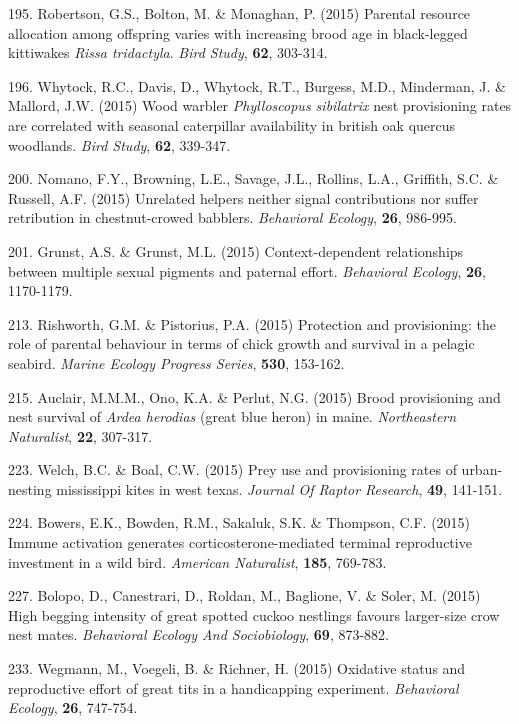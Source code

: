 195. Robertson, G.S., Bolton, M. \&  Monaghan, P. (2015) Parental resource allocation among offspring varies with increasing brood age in black-legged kittiwakes \textit{Rissa tridactyla}. \textit{Bird Study},  \textbf{62}, 303-314.

196. Whytock, R.C., Davis, D., Whytock, R.T., Burgess, M.D., Minderman, J. \&  Mallord, J.W. (2015) Wood warbler \textit{Phylloscopus sibilatrix} nest provisioning rates are correlated with seasonal caterpillar availability in british oak quercus woodlands. \textit{Bird Study},  \textbf{62}, 339-347.

200. Nomano, F.Y., Browning, L.E., Savage, J.L., Rollins, L.A., Griffith, S.C. \&  Russell, A.F. (2015) Unrelated helpers neither signal contributions nor suffer retribution in chestnut-crowed babblers. \textit{Behavioral Ecology},  \textbf{26}, 986-995.

201. Grunst, A.S. \&  Grunst, M.L. (2015) Context-dependent relationships between multiple sexual pigments and paternal effort. \textit{Behavioral Ecology},  \textbf{26}, 1170-1179.

213. Rishworth, G.M. \&  Pistorius, P.A. (2015) Protection and provisioning: the role of parental behaviour in terms of chick growth and survival in a pelagic seabird. \textit{Marine Ecology Progress Series},  \textbf{530}, 153-162.

215. Auclair, M.M.M., Ono, K.A. \&  Perlut, N.G. (2015) Brood provisioning and nest survival of \textit{Ardea herodias} (great blue heron) in maine. \textit{Northeastern Naturalist},  \textbf{22}, 307-317.

223. Welch, B.C. \&  Boal, C.W. (2015) Prey use and provisioning rates of urban-nesting mississippi kites in west texas. \textit{Journal Of Raptor Research},  \textbf{49}, 141-151.

224. Bowers, E.K., Bowden, R.M., Sakaluk, S.K. \&  Thompson, C.F. (2015) Immune activation generates corticosterone-mediated terminal reproductive investment in a wild bird. \textit{American Naturalist},  \textbf{185}, 769-783.

227. Bolopo, D., Canestrari, D., Roldan, M., Baglione, V. \&  Soler, M. (2015) High begging intensity of great spotted cuckoo nestlings favours larger-size crow nest mates. \textit{Behavioral Ecology And Sociobiology},  \textbf{69}, 873-882.

233. Wegmann, M., Voegeli, B. \&  Richner, H. (2015) Oxidative status and reproductive effort of great tits in a handicapping experiment. \textit{Behavioral Ecology},  \textbf{26}, 747-754.

